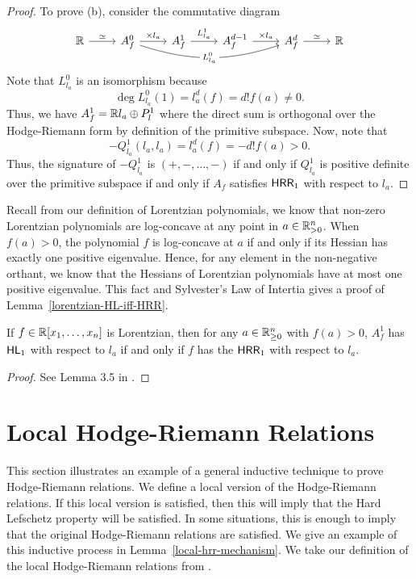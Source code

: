 \documentclass{puthesis-UG}
\begin{document}
\begin{proof}
To prove (b), consider the commutative diagram
\[\begin{tikzcd}
	{\mathbb{R}} & {A^0_f} & {A_f^1} & {A_f^{d-1}} & {A_f^d} & {\mathbb{R}}
	\arrow["{\times l_a}", from=1-2, to=1-3]
	\arrow["{L_{l_a}^1}", from=1-3, to=1-4]
	\arrow["{\times l_a}", from=1-4, to=1-5]
	\arrow["\simeq", from=1-1, to=1-2]
	\arrow["\simeq", from=1-5, to=1-6]
	\arrow["L_{l_a}^0"{description}, bend right= 18, from=1-2, to=1-5]
\end{tikzcd}\]
Note that $L_{l_a}^0$ is an isomorphism because 
\[
	\deg L_{l_a}^0 (1) = l_a^d (f)  = d! f(a) \neq 0.
\]
Thus, we have $A_f^1 = \mathbb{R} l_a \oplus P_l^1$ where the direct sum is orthogonal over the Hodge-Riemann form by definition of the primitive subspace. Now, note that 
\[
	-Q_{l_a}^1(l_a, l_a) = l_a^d (f) = -d! f(a) > 0. 
\]
Thus, the signature of $-Q_{l_a}^1$ is $(+, -, \ldots, -)$ if and only if $Q_{l_a}^1$ is positive definite over the primitive subspace if and only if $A_f$ satisfies $\mathsf{HRR}_1$ with respect to $l_a$. 
\end{proof}

Recall from our definition of Lorentzian polynomials, we know that non-zero Lorentzian polynomials are log-concave at any point in $a \in \mathbb{R}_{> 0}^n$. When $f(a) > 0$, the polynomial $f$ is log-concave at $a$ if and only if its Hessian has exactly one positive eigenvalue. Hence, for any element in the non-negative orthant, we know that the Hessians of Lorentzian polynomials have at most one positive eigenvalue. This fact and Sylvester's Law of Intertia gives a proof of Lemma~\ref{lorentzian-HL-iff-HRR}.

\begin{lem} \label{lorentzian-HL-iff-HRR}
	If $f \in \mathbb{R} [x_1, \ldots, x_n]$ is Lorentzian, then for any $a \in \mathbb{R}_{\geq 0}^n$ with $f(a) > 0$, $A_f^1$ has $\mathsf{HL}_1$ with respect to $l_a$ if and only if $f$ has the $\mathsf{HRR}_1$ with respect to $l_a$. 
\end{lem}

\begin{proof}
	See Lemma 3.5 in \cite{MNY}. 
\end{proof}

\section{Local Hodge-Riemann Relations}

This section illustrates an example of a general inductive technique to prove Hodge-Riemann relations. We define a local version of the Hodge-Riemann relations. If this local version is satisfied, then this will imply that the Hard Lefschetz property will be satisfied. In some situations, this is enough to imply that the original Hodge-Riemann relations are satisfied. We give an example of this inductive process in Lemma~\ref{local-hrr-mechanism}. We take our definition of the local Hodge-Riemann relations from \cite{MNY}. 
\end{document}
